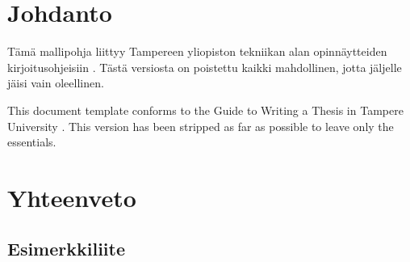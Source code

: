 \documentclass{tauthesis}
\begin{document}

\listoffigures
\listoftables


\glossary


\mainmatter

\chapter{Johdanto}
\label{ch:johdanto}

Tämä mallipohja liittyy Tampereen yliopiston tekniikan alan opinnäytteiden kirjoitusohjeisiin \parencite{kirjoitusohje2018}.
Tästä versiosta on poistettu kaikki mahdollinen, jotta jäljelle jäisi vain oleellinen.

This document template conforms to the Guide to Writing a Thesis in Tampere University \parencite{thesisguide2018}.
This version has been stripped as far as possible to leave only the essentials.


\chapter{Yhteenveto}
\label{ch:yhteenveto}



\printbibliography[heading=bibintoc]



\begin{appendices}

\chapter{Esimerkkiliite}
\label{ch:liite}


\end{appendices}
\end{document}
